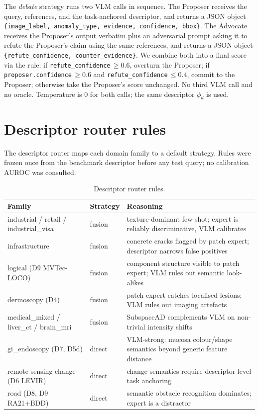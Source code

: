 The \emph{debate} strategy runs two VLM calls in sequence. The Proposer receives the query, references, and the task-anchored descriptor, and returns a JSON object \texttt{\{image\_label, anomaly\_type, evidence, confidence, bbox\}}. The Advocate receives the Proposer's output verbatim plus an adversarial prompt asking it to refute the Proposer's claim using the same references, and returns a JSON object \texttt{\{refute\_confidence, counter\_evidence\}}. We combine both into a final score via the rule: if \texttt{refute\_confidence}\,$\geq 0.6$, overturn the Proposer; if \texttt{proposer.confidence}\,$\geq 0.6$ and \texttt{refute\_confidence}\,$\leq 0.4$, commit to the Proposer; otherwise take the Proposer's score unchanged. No third VLM call and no oracle. Temperature is 0 for both calls; the same descriptor $\phi_d$ is used.

\section{Descriptor router rules}
\label{app:router_rules}

The descriptor router maps each domain family to a default strategy. Rules were frozen once from the benchmark descriptor before any test query; no calibration AUROC was consulted.

\begin{table}[h]
\centering
\caption{Descriptor router rules.}
\label{tab:router_rules}
\small
\begin{tabular}{llp{7cm}}
\toprule
Family & Strategy & Reasoning \\
\midrule
industrial / retail / industrial\_visa & fusion & texture-dominant few-shot; expert is reliably discriminative, VLM calibrates \\
infrastructure & fusion & concrete cracks flagged by patch expert; descriptor narrows false positives \\
logical (D9 MVTec-LOCO) & fusion & component structure visible to patch expert; VLM rules out semantic look-alikes \\
dermoscopy (D4) & fusion & patch expert catches localised lesions; VLM rules out imaging artefacts \\
medical\_mixed / liver\_ct / brain\_mri & fusion & SubspaceAD complements VLM on non-trivial intensity shifts \\
gi\_endoscopy (D7, D5d) & direct & VLM-strong: mucosa colour/shape semantics beyond generic feature distance \\
remote-sensing change (D6 LEVIR) & direct & change semantics require descriptor-level task anchoring \\
road (D8, D9 RA21+BDD) & direct & semantic obstacle recognition dominates; expert is a distractor \\
\bottomrule
\end{tabular}
\end{table}

